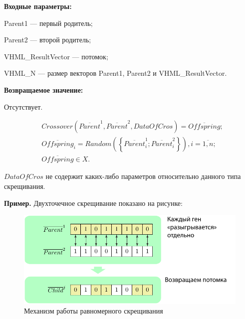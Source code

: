 \textbf{Входные параметры:}
 
 Parent1 --- первый родитель;
 
 Parent2 --- второй родитель;
 
 VHML\_ResultVector --- потомок;
 
 VHML\_N --- размер векторов Parent1, Parent2 и VHML\_ResultVector.

\textbf{Возвращаемое значение:}

 Отсутствует.
 
\begin{align*}
&Crossover \left( \overline{Parent}^1, \overline{Parent}^2, DataOfCros\right) = \overline{Offspring};\\
& \overline{Offspring}_i=Random\left( \left\lbrace \overline{Parent}^1_i;\overline{Parent}^2_i\right\rbrace \right), i=\overline{1,n} ;\nonumber\\
&\overline{Offspring}\in X.\nonumber
\end{align*}

$ DataOfCros $ не содержит каких-либо параметров относительно данного типа скрещивания.

\textbf{Пример.} Двухточечное скрещивание показано на рисунке:

\begin{figure} [h]
  \center
  \includegraphics [scale=0.8] {HML_UniformCrossover_Sheme}
  \caption{Механизм работы равномерного скрещивания} 
  \label{img:HML_UniformCrossover_Sheme}  
\end{figure}